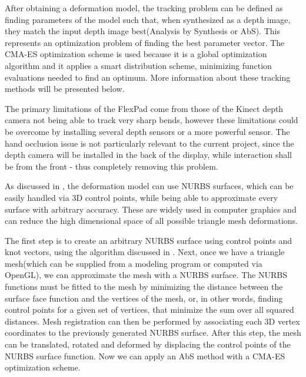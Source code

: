 \documentclass[]{article}
\begin{document}
After obtaining a deformation model, the tracking problem can be defined as finding parameters of the model such that, when synthesized as a depth image, they match the input depth image best(Analysis by Synthesis or AbS). This represents an optimization problem of finding the best parameter vector. The CMA-ES optimization scheme is used because it is a global optimization algorithm and it applies a smart distribution scheme, minimizing function evaluations needed to find an optimum. More information about these tracking methods will be presented below.

The primary limitations of the FlexPad come from those of the Kinect depth camera not being able to track very sharp bends, however these limitations could be overcome by installing several depth sensors or a more powerful sensor. The hand occlusion issue is not particularly relevant to the current project, since the depth camera will be installed in the back of the display, while interaction shall be from the front  - thus completely removing this problem.

As discussed in \cite{jordt12}, the deformation model can use NURBS surfaces, which can be easily handled via 3D control points, while being able to approximate every surface with arbitrary accuracy. These are widely used in computer graphics and can reduce the high dimensional space of all possible triangle mesh deformations.

The first step is to create an arbitrary NURBS surface using control points and knot vectors, using the algorithm discussed in \cite{jordt12}. Next, once we have a triangle mesh(which can be supplied from a modeling program or computed via OpenGL), we can approximate the mesh with a NURBS surface. The NURBS functions must be fitted to the mesh by minimizing the distance between the surface face function and the vertices of the mesh, or, in other words, finding control points for a given set of vertices, that minimize the sum over all squared distances. Mesh registration can then be performed by associating each 3D vertex coordinates to the previously generated NURBS surface. After this step, the mesh can be translated, rotated and deformed by displacing the control points of the NURBS surface function. Now we can apply an AbS method with a CMA-ES optimization scheme.\\
\end{document}
